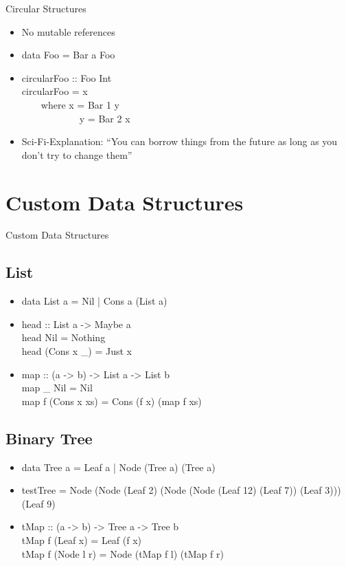 \documentclass{beamer}                  %
\newcommand{\srule}{
	\rule{\textwidth}{1pt}\\
}
\newlength{\subsecwidth}
\newenvironment{slide}{
	\begin{frame} %
	\settowidth{\subsecwidth}{\insertsubsection} %
	\ifthenelse{\dimtest{\subsecwidth}{<}{1pt}}{ %
		\frametitle{\insertsection\\             %
		\vspace{-1ex}                            %
		\color{fore}\srule                       %
		\par                                     %
		\vspace{-3ex}                            %
		}
	}{                                           %
		\frametitle{\insertsection\ -- \insertsubsection\\ %
		\vspace{-1ex}                            %
		\color{fore}\srule                       %
		\par                                     %
		\vspace{-3ex}                            %
		}
	}
	\Large                                       %
}{
	\end{frame}
}
\newcommand{\titleslide}[1]{
	\section{#1}             %
	\begin{slide}
		\begin{center}
			\color{comments}
			\Huge            %
			#1               %
		\end{center}
	\end{slide}
}
\begin{document}
\begin{slide}
  Circular Structures
  \begin{itemize}
    \item No mutable references
    \item data Foo = Bar a Foo
    \item
      circularFoo :: Foo Int\\
      circularFoo = x\\
        ~~~~where x = Bar 1 y\\
        ~~~~~~~~~~~~y = Bar 2 x
      \item Sci-Fi-Explanation: ``You can borrow things from the future as long as you don't try to change them''
  \end{itemize}
\end{slide}


\titleslide{Custom Data Structures}
\subsection{List}

\begin{slide}
  \begin{itemize}
    \item data List a = Nil | Cons a (List a)
    \item
      head :: List a -> Maybe a\\
      head Nil        = Nothing\\
      head (Cons x \_) = Just x
    \item
      map :: (a -> b) -> List a -> List b\\
      map \_ Nil        = Nil\\
      map f (Cons x xs) = Cons (f x) (map f xs)
  \end{itemize}
\end{slide}

\subsection{Binary Tree}
\begin{slide}
  \begin{itemize}
    \item data Tree a = Leaf a | Node (Tree a) (Tree a)
    \item testTree = Node (Node (Leaf 2) (Node (Node (Leaf 12) (Leaf 7)) (Leaf 3))) (Leaf 9)
    \item
      tMap :: (a -> b) -> Tree a -> Tree b\\
      tMap f (Leaf x)   = Leaf (f x)\\
      tMap f (Node l r) = Node (tMap f l) (tMap f r)
  \end{itemize}
\end{slide}
\end{document}
